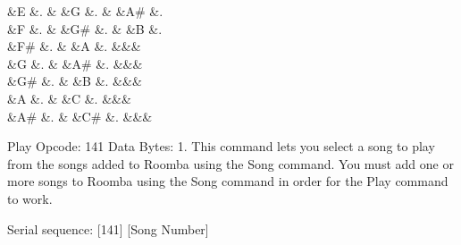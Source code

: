 \begin{Desc}
\begin{description}
\begin{TabularC}{9}
\PBS{} &\PBS\centering E &\PBS{}. &\PBS{} &\PBS\centering G &\PBS{}. &\PBS{} &\PBS\centering A\# &\PBS{}. \\
\PBS{} &\PBS\centering F &\PBS{}. &\PBS{} &\PBS\centering G\# &\PBS{}. &\PBS{} &\PBS\centering B &\PBS{}. \\
\PBS{} &\PBS\centering F\# &\PBS{}. &\PBS{} &\PBS\centering A &\PBS{}. &\PBS\raggedleft &\PBS\centering &\PBS\centering \\
\PBS{} &\PBS\centering G &\PBS{}. &\PBS{} &\PBS\centering A\# &\PBS{}. &\PBS\raggedleft &\PBS\centering &\PBS\centering \\
\PBS{} &\PBS\centering G\# &\PBS{}. &\PBS{} &\PBS\centering B &\PBS{}. &\PBS\raggedleft &\PBS\centering &\PBS\centering \\
\PBS{} &\PBS\centering A &\PBS{}. &\PBS{} &\PBS\centering C &\PBS{}. &\PBS\raggedleft &\PBS\centering &\PBS\centering \\
\PBS{} &\PBS\centering A\# &\PBS{}. &\PBS{} &\PBS\centering C\# &\PBS{}. &\PBS\raggedleft &\PBS\centering &\PBS\centering \\
\end{TabularC}
\item[{\em 
\hypertarget{group__roomba-lib_gga305e17dfb7050ad83ea49ded2e6a2e24adfc5020e343dfdc400651002301374b2}{}R\+O\+O\+M\+B\+A\+\_\+\+P\+L\+A\+Y\label{group__roomba-lib_gga305e17dfb7050ad83ea49ded2e6a2e24adfc5020e343dfdc400651002301374b2}
}]Play Opcode\+: 141 Data Bytes\+: 1. This command lets you select a song to play from the songs added to Roomba using the Song command. You must add one or more songs to Roomba using the Song command in order for the Play command to work.
\begin{DoxyItemize}
\item Serial sequence\+: \mbox{[}141\mbox{]} \mbox{[}Song Number\mbox{]}

\end{DoxyItemize}
\end{description}
\end{Desc}
